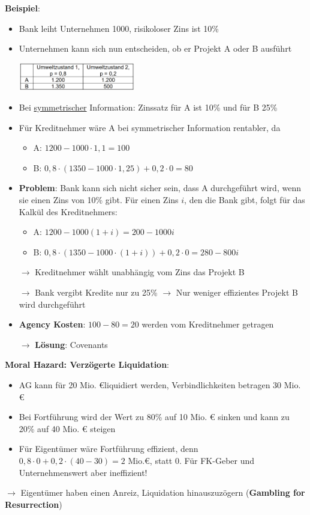 \textbf{Beispiel}:
\begin{itemize}
	\item Bank leiht Unternehmen 1000, risikoloser Zins ist 10\%
	\item Unternehmen kann sich nun entscheiden, ob er Projekt A oder B ausführt
	\begin{center}
		\includegraphics[width=0.4\textwidth]{images/as-1.png}
	\end{center} 
	\item Bei \underline{symmetrischer} Information: Zinssatz für A ist 10\% und für B 25\%
	\item Für Kreditnehmer wäre A bei symmetrischer Information rentabler, da
	\begin{itemize}
		\item A: $1200-1000\cdot 1,1=100$
		\item B: $0,8\cdot(1350-1000\cdot 1,25)+0,2\cdot 0=80$
	\end{itemize}
	\item \textbf{Problem}: Bank kann sich nicht sicher sein, dass A durchgeführt wird, wenn sie einen Zins von 10\% gibt. Für einen Zins $i$, den die Bank gibt, folgt für das Kalkül des Kreditnehmers:
	\begin{itemize}
		\item A: $1200-1000(1+i)=200-1000i$
		\item B: $0,8\cdot(1350-1000\cdot (1+i))+0,2\cdot 0=280-800i$
	\end{itemize}
	
	$\rightarrow$ Kreditnehmer wählt unabhängig vom Zins das Projekt B
	
	$\rightarrow$ Bank vergibt Kredite nur zu 25\% $\rightarrow$ Nur weniger effizientes Projekt B wird durchgeführt
	
	\item \textbf{Agency Kosten}: $100-80=20$ werden vom Kreditnehmer getragen 
	
	$\rightarrow$ \textbf{Lösung}: Covenants
\end{itemize}

\textbf{Moral Hazard: Verzögerte Liquidation}:
\begin{itemize}
	\item AG kann für 20 Mio. \euro\text{ }liquidiert werden, Verbindlichkeiten betragen 30 Mio. \euro
	\item Bei Fortführung wird der Wert zu 80\% auf 10 Mio. \euro\text{ } sinken und kann zu 20\% auf 40 Mio. \euro\text{ } steigen
	\item Für Eigentümer wäre Fortführung effizient, denn $0,8\cdot 0+0,2\cdot(40-30)=2\text{ Mio.}$\euro, statt 0. Für FK-Geber und Unternehmenswert aber ineffizient!
\end{itemize}
$\rightarrow$ Eigentümer haben einen Anreiz, Liquidation hinauszuzögern (\textbf{Gambling for Resurrection})\\

